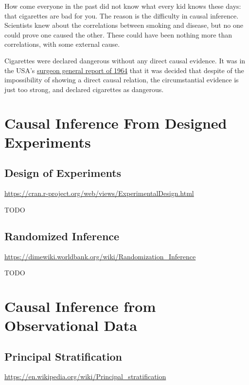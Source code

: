 \documentclass[]{book}
\theoremstyle{definition}
\theoremstyle{definition}
\theoremstyle{definition}
\theoremstyle{remark}
\begin{document}
How come everyone in the past did not know what every kid knows these
days: that cigarettes are bad for you. The reason is the difficulty in
causal inference. Scientists knew about the correlations between smoking
and disease, but no one could prove one caused the other. These could
have been nothing more than correlations, with some external cause.

Cigarettes were declared dangerous without any direct causal evidence.
It was in the USA's
\href{https://profiles.nlm.nih.gov/ps/retrieve/Narrative/NN/p-nid/60}{surgeon
general report of 1964} that it was decided that despite of the
impossibility of showing a direct causal relation, the circumstantial
evidence is just too strong, and declared cigarettes as dangerous.

\section{Causal Inference From Designed
Experiments}\label{causal-inference-from-designed-experiments}

\subsection{Design of Experiments}\label{design-of-experiments}

\url{https://cran.r-project.org/web/views/ExperimentalDesign.html}

TODO

\subsection{Randomized Inference}\label{randomized-inference}

\url{https://dimewiki.worldbank.org/wiki/Randomization_Inference}

TODO

\section{Causal Inference from Observational
Data}\label{causal-inference-from-observational-data}

\subsection{Principal Stratification}\label{principal-stratification}

\citet{frumento2012evaluating}

\url{https://en.wikipedia.org/wiki/Principal_stratification}
\end{document}
